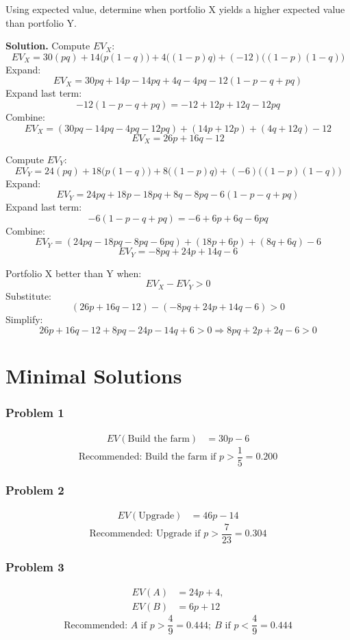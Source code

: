 \begin{ExamProblems}
		Using expected value, determine when portfolio X yields a higher expected value than portfolio Y.
		
		\textbf{Solution.}
		Compute \(EV_X\):
		\[
		EV_X=30(pq)+14\bigl(p(1-q)\bigr)+4\bigl((1-p)q\bigr)+(-12)\bigl((1-p)(1-q)\bigr)
		\]
		Expand:
		\[
		EV_X=30pq + 14p - 14pq + 4q - 4pq - 12(1-p-q+pq)
		\]
		Expand last term:
		\[
		-12(1-p-q+pq)=-12 + 12p + 12q - 12pq
		\]
		Combine:
		\[
		EV_X=(30pq-14pq-4pq-12pq) + (14p+12p) + (4q+12q) - 12
		\]
		\[
		EV_X=26p + 16q - 12
		\]
		
		Compute \(EV_Y\):
		\[
		EV_Y=24(pq)+18\bigl(p(1-q)\bigr)+8\bigl((1-p)q\bigr)+(-6)\bigl((1-p)(1-q)\bigr)
		\]
		Expand:
		\[
		EV_Y=24pq + 18p - 18pq + 8q - 8pq - 6(1-p-q+pq)
		\]
		Expand last term:
		\[
		-6(1-p-q+pq)=-6 + 6p + 6q - 6pq
		\]
		Combine:
		\[
		EV_Y=(24pq-18pq-8pq-6pq) + (18p+6p) + (8q+6q) - 6
		\]
		\[
		EV_Y=-8pq + 24p + 14q - 6
		\]
		
		Portfolio X better than Y when:
		\[
		EV_X-EV_Y>0
		\]
		Substitute:
		\[
		(26p+16q-12)-(-8pq+24p+14q-6)>0
		\]
		Simplify:
		\[
		26p+16q-12+8pq-24p-14q+6>0
		\Rightarrow 8pq+2p+2q-6>0
		\]
		
	\end{ExamProblems}



\part{Minimal Solutions}
\section*{Problem 1}
\[
\begin{aligned}
	EV(\text{Build the farm}) &= 30p-6
\end{aligned}
\]
\[
\text{Recommended: } \text{Build the farm if } p>\frac{1}{5}=0.200
\]

\section*{Problem 2}
\[
\begin{aligned}
	EV(\text{Upgrade}) &= 46p-14
\end{aligned}
\]
\[
\text{Recommended: } \text{Upgrade if } p>\frac{7}{23}=0.304
\]

\section*{Problem 3}
\[
\begin{aligned}
	EV(A) &= 24p+4,\\
	EV(B) &= 6p+12
\end{aligned}
\]
\[
\text{Recommended: } A \text{ if } p>\frac{4}{9}=0.444;\ B \text{ if } p<\frac{4}{9}=0.444
\]

